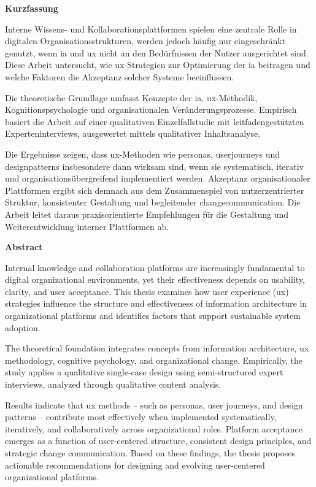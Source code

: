 \clearpage

\begin{center}
    {\LARGE\textbf{Kurzfassung}}
\end{center}
\vspace{1em}

Interne Wissens- und Kollaborationsplattformen spielen eine zentrale Rolle in digitalen Organisationsstrukturen, werden jedoch häufig nur eingeschränkt genutzt, wenn \Gls{ia} und \Gls{ux} nicht an den Bedürfnissen der Nutzer ausgerichtet sind. Diese Arbeit untersucht, wie \Gls{ux}-Strategien zur Optimierung der \Gls{ia} beitragen und welche Faktoren die Akzeptanz solcher Systeme beeinflussen.

Die theoretische Grundlage umfasst Konzepte der \Gls{ia}, \Gls{ux}-Methodik, Kognitionspsychologie und organisationalen Veränderungsprozesse. Empirisch basiert die Arbeit auf einer qualitativen Einzelfallstudie mit leitfadengestützten Experteninterviews, ausgewertet mittels qualitativer Inhaltsanalyse.

Die Ergebnisse zeigen, dass \Gls{ux}-Methoden wie \Gls{personas}, \Gls{userjourneys} und \Gls{designpatterns} insbesondere dann wirksam sind, wenn sie systematisch, iterativ und organisationsübergreifend implementiert werden. Akzeptanz organisationaler Plattformen ergibt sich demnach aus dem Zusammenspiel von nutzerzentrierter Struktur, konsistenter Gestaltung und begleitender \Gls{changecommunication}. Die Arbeit leitet daraus praxisorientierte Empfehlungen für die Gestaltung und Weiterentwicklung interner Plattformen ab.
\vfil

\begin{center}
    {\LARGE\textbf{Abstract}}
\end{center}
\vspace{1em}

Internal knowledge and collaboration platforms are increasingly fundamental to digital organizational environments, yet their effectiveness depends on usability, clarity, and user acceptance. This thesis examines how user experience (\acrshort{ux}) strategies influence the structure and effectiveness of information architecture in organizational platforms and identifies factors that support sustainable system adoption.

The theoretical foundation integrates concepts from information architecture, \Gls{ux} methodology, cognitive psychology, and organizational change. Empirically, the study applies a qualitative single-case design using semi-structured expert interviews, analyzed through qualitative content analysis.

Results indicate that \Gls{ux} methods -- such as personas, user journeys, and design patterns -- contribute most effectively when implemented systematically, iteratively, and collaboratively across organizational roles. Platform acceptance emerges as a function of user-centered structure, consistent design principles, and strategic change communication. Based on these findings, the thesis proposes actionable recommendations for designing and evolving user-centered organizational platforms. 